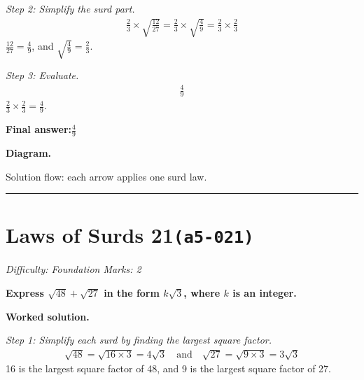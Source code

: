 \documentclass[11pt]{article}
\newcommand{\question}[1]{\par\medskip\noindent\textbf{#1}\par}
\begin{document}
\textit{Step 2: Simplify the surd part.}
\[\begin{gathered}
\frac{2}{3} \times \sqrt{\frac{12}{27}} = \frac{2}{3} \times \sqrt{\frac{4}{9}} = \frac{2}{3} \times \frac{2}{3}
\end{gathered}\]
\( \frac{12}{27} = \frac{4}{9} \), and \( \sqrt{\frac{4}{9}} = \frac{2}{3} \).

\textit{Step 3: Evaluate.}
\[\begin{gathered}
\frac{4}{9}
\end{gathered}\]
\( \frac{2}{3} \times \frac{2}{3} = \frac{4}{9} \).

\begin{answerbox}
\textbf{Final answer:}\quad \(\displaystyle \frac{4}{9}\)
\end{answerbox}
\textbf{Diagram.}

\begin{center}
\end{center}
\small Solution flow: each arrow applies one surd law.\normalsize

\medskip\hrule

\section*{Laws of Surds 21\quad\small\texttt{(a5-021)}}
\textit{Difficulty: Foundation \quad\textbar\quad Marks: 2}

\question{Express \( \sqrt{48} + \sqrt{27} \) in the form \( k\sqrt{3} \), where \( k \) is an integer.}

\textbf{Worked solution.}

\textit{Step 1: Simplify each surd by finding the largest square factor.}
\[\begin{gathered}
\sqrt{48} = \sqrt{16 \times 3} = 4\sqrt{3} \quad \text{and} \quad \sqrt{27} = \sqrt{9 \times 3} = 3\sqrt{3}
\end{gathered}\]
16 is the largest square factor of 48, and 9 is the largest square factor of 27.
\end{document}
